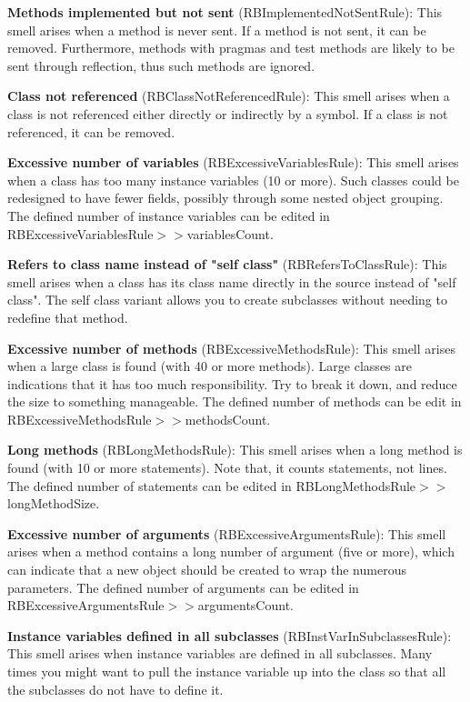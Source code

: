 \textbf{Methods implemented but not sent} (RBImplementedNotSentRule): This smell arises when a method is never sent. If a method is not sent, it can be removed. Furthermore, methods with pragmas and test methods are likely to be sent through reflection, thus such methods are ignored.

\textbf{Class not referenced} (RBClassNotReferencedRule): This smell arises when a class is not referenced either directly or indirectly by a symbol. If a class is not referenced, it can be removed.

\textbf{Excessive number of variables} (RBExcessiveVariablesRule): This smell arises when a class has too many instance variables (10 or more). Such classes could be redesigned to have fewer fields, possibly through some nested object grouping. The defined number of instance variables can be edited in RBExcessiveVariablesRule$>>$variablesCount.

\textbf{Refers to class name instead of "self class"} (RBRefersToClassRule): This smell arises when a class has its class name directly in the source instead of "self class". The self class variant allows you to create subclasses without needing to redefine that method.

\textbf{Excessive number of methods} (RBExcessiveMethodsRule): This smell arises when a large class is found (with 40 or more methods). Large classes are indications that it has too much responsibility. Try to break it down, and reduce the size to something manageable. The defined number of methods can be edit in RBExcessiveMethodsRule$>>$methodsCount.

\textbf{Long methods} (RBLongMethodsRule): This smell arises when a long method is found (with 10 or more statements). Note that, it counts statements, not lines. The defined number of statements can be edited in RBLongMethodsRule$>>$longMethodSize.

\textbf{Excessive number of arguments} (RBExcessiveArgumentsRule): This smell arises when a method contains a long number of argument (five or more), which can indicate that a new object should be created to wrap the numerous parameters. The defined number of arguments can be edited in RBExcessiveArgumentsRule$>>$argumentsCount.

\textbf{Instance variables defined in all subclasses} (RBInstVarInSubclassesRule): This smell arises when instance variables are defined in all subclasses. Many times you might want to pull the instance variable up into the class so that all the subclasses do not have to define it.

